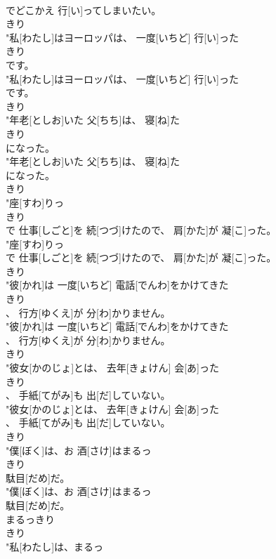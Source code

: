\documentclass[8pt]{extreport}
\begin{document}
\begin{CJK}{UTF8}{min}
\\	でどこかえ 行[い]ってしまいたい。
\\	きり
\\	"私[わたし]はヨーロッパは、 一度[いちど] 行[い]った
\\	きり
\\	です。
\\	"私[わたし]はヨーロッパは、 一度[いちど] 行[い]った
\\	です。
\\	きり
\\	"年老[としお]いた 父[ちち]は、 寝[ね]た
\\	きり
\\	になった。
\\	"年老[としお]いた 父[ちち]は、 寝[ね]た
\\	になった。
\\	きり
\\	"座[すわ]りっ
\\	きり
\\	で 仕事[しごと]を 続[つづ]けたので、 肩[かた]が 凝[こ]った。
\\	"座[すわ]りっ
\\	で 仕事[しごと]を 続[つづ]けたので、 肩[かた]が 凝[こ]った。
\\	きり
\\	"彼[かれ]は 一度[いちど] 電話[でんわ]をかけてきた
\\	きり
\\	、 行方[ゆくえ]が 分[わ]かりません。
\\	"彼[かれ]は 一度[いちど] 電話[でんわ]をかけてきた
\\	、 行方[ゆくえ]が 分[わ]かりません。
\\	きり
\\	"彼女[かのじょ]とは、 去年[きょけん] 会[あ]った
\\	きり
\\	、 手紙[てがみ]も 出[だ]していない。
\\	"彼女[かのじょ]とは、 去年[きょけん] 会[あ]った
\\	、 手紙[てがみ]も 出[だ]していない。
\\	きり
\\	"僕[ぼく]は、お 酒[さけ]はまるっ
\\	きり
\\	駄目[だめ]だ。
\\	"僕[ぼく]は、お 酒[さけ]はまるっ
\\	駄目[だめ]だ。
\\	まるっきり	
\\	きり
\\	"私[わたし]は、まるっ

\end{CJK}
\end{document}
